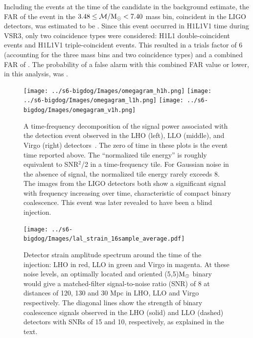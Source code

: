 Including the events at the time of the candidate in the background estimate,
the FAR of the event in the $3.48 \le \mathcal{M}/\mathrm{M_\odot} < 7.40$ mass bin,
coincident in the LIGO detectors, was estimated to be \dogTrialFAR.
Since this event occurred in H1L1V1 time during VSR3, only two coincidence
types were considered: H1L1 double-coincident events and H1L1V1
triple-coincident events.  This resulted in a trials factor of 6 (accounting
for the three mass bins and two coincidence types) and a combined FAR of
\dogFAR.  The probability of a false alarm with this combined FAR
value or lower, in this analysis, was \dogFAP.

\begin{figure}[htb]
\begin{center}
\texttt{[image: ../s6-bigdog/Images/omegagram\_h1h.png]}
\texttt{[image: ../s6-bigdog/Images/omegagram\_l1h.png]}
\texttt{[image: ../s6-bigdog/Images/omegagram\_v1h.png]}
\caption{A time-frequency decomposition of the signal power associated with the
detection event observed in the \ac{LHO} (left), \ac{LLO} (middle), and Virgo
(right) detectors~\cite{ref:omegagrams}.  The zero of time in these plots is
the event time reported above.  The ``normalized tile energy'' is roughly
equivalent to SNR$^2$/2 in a time-frequency tile. For Gaussian noise in the
absence of signal, the normalized tile energy rarely exceeds 8.  The images
from the LIGO detectors both show a significant signal with frequency
increasing over time, characteristic of compact binary coalescence.
This event was later revealed to have been a blind injection.}
\label{fig:omegagrams}
\end{center}
\end{figure}

\begin{figure}[t]
\texttt{[image: ../s6-bigdog/Images/lal\_strain\_16sample\_average.pdf]}
\caption{Detector strain amplitude spectrum around the time of the injection:
\ac{LHO} in red, \ac{LLO} in green and Virgo in magenta.  At these noise
levels, an optimally located and oriented (5,5)$\mathrm{M_\odot}$ binary would give a
matched-filter signal-to-noise ratio (SNR) of 8 at distances of 120, 130 and 30
Mpc in LHO, LLO and Virgo respectively.  The diagonal lines show the strength
of binary coalescence signals observed in the LHO (solid) and LLO (dashed)
detectors with SNRs of 15 and 10, respectively, as explained in the text.
\label{f:noise_curve}}
\end{figure}

